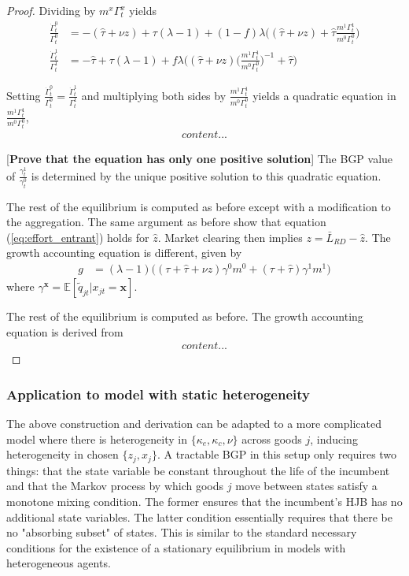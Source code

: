 \documentclass[11pt,english]{article}
\begin{document}
\begin{proof}
	Dividing by $m^x \Gamma_t^x$ yields
	\begin{align}
	\frac{\dot{\Gamma}_t^0}{\Gamma_t^0} &= -( \hat{\tau} + \nu z) + \tau (\lambda - 1) + (1-f)\lambda \Big( (\hat{\tau} + \nu z) + \hat{\tau} \frac{m^1 \Gamma_t^1 }{m^0 \Gamma_t^0}\Big) \\
	\frac{\dot{\Gamma}_t^1}{\Gamma_t^1} &= -\hat{\tau}  + \tau (\lambda - 1) + f\lambda \Big( (\hat{\tau} + \nu z) \big(\frac{m^1 \Gamma_t^1}{m^0 \Gamma_t^0}\big)^{-1} + \hat{\tau}  \Big)
	\end{align}
	
	Setting $\frac{\dot{\Gamma}_t^0}{\Gamma_t^0} = \frac{\dot{\Gamma}_t^1}{\Gamma_t^1}$ and multiplying both sides by $\frac{m^1 \Gamma_t^1}{m^0 \Gamma_t^0}$ yields a quadratic equation in $\frac{m^1 \Gamma_t^1}{m^0 \Gamma_t^0}$,
	\begin{align}
		content...
	\end{align}
	
	[\textbf{Prove that the equation has only one positive solution}] The BGP value of $\frac{\gamma_t^1}{\gamma_t^0}$ is determined by the unique positive solution to this quadratic equation. 
	
	The rest of the equilibrium is computed as before except with a modification to the aggregation. The same argument as before show that equation (\ref{eq:effort_entrant}) holds for $\hat{z}$. Market clearing then implies $z = \bar{L}_{RD} - \hat{z}$. The growth accounting equation is different, given by
	\begin{align}
		g &= (\lambda - 1) \Big( (\tau + \hat{\tau} + \nu z) \gamma^0 m^0 + (\tau + \hat{\tau}) \gamma^1 m^1) 
	\end{align}
	where $\gamma^{\mathbf{x}} = \mathbb{E}[\tilde{q}_{jt} | x_{jt} = \mathbf{x}]$.
	
	The rest of the equilibrium is computed as before. The growth accounting equation is derived from
	\begin{align}
		content...
	\end{align}
\end{proof}

\subsubsection{Application to model with static heterogeneity}

The above construction and derivation can be adapted to a more complicated model where there is heterogeneity in $\{\kappa_e, \kappa_c, \nu\}$ across goods $j$, inducing heterogeneity in chosen $\{z_j,x_j\}$. A tractable BGP in this setup only requires two things: that the state variable be constant throughout the life of the incumbent and that the Markov process by which goods $j$ move between states satisfy a monotone mixing condition. The former ensures that the incumbent's HJB has no additional state variables. The latter condition essentially requires that there be no "absorbing subset" of states. This is similar to the standard necessary conditions for the existence of a stationary equilibrium in models with heterogeneous agents.
\end{document}
